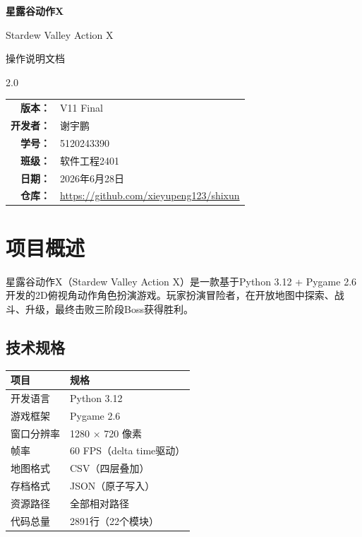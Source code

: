 \documentclass[12pt,a4paper]{ctexart}
\begin{document}
\begin{titlepage}
\thispagestyle{empty}
\centering
\vspace*{2cm}
{\Huge\bfseries\sffamily 星露谷动作X}

\vspace{0.5cm}
{\LARGE Stardew Valley Action X}

\vspace{1cm}
{\Large 操作说明文档}

\vspace{3cm}
\begin{spacing}{2.0}
\begin{tabular}{rl}
\textbf{版本：} & V11 Final \\
\textbf{开发者：} & 谢宇鹏 \\
\textbf{学号：} & 5120243390 \\
\textbf{班级：} & 软件工程2401 \\
\textbf{日期：} & 2026年6月28日 \\
\textbf{仓库：} & \url{https://github.com/xieyupeng123/shixun} \\
\end{tabular}
\end{spacing}
\vfill
\end{titlepage}

\tableofcontents
\newpage

\section{项目概述}

星露谷动作X（Stardew Valley Action X）是一款基于Python 3.12 + Pygame 2.6开发的2D俯视角动作角色扮演游戏。玩家扮演冒险者，在开放地图中探索、战斗、升级，最终击败三阶段Boss获得胜利。

\subsection{技术规格}

\begin{table}[H]
\centering
\begin{tabular}{ll}
\toprule
\textbf{项目} & \textbf{规格} \\
\midrule
开发语言 & Python 3.12 \\
游戏框架 & Pygame 2.6 \\
窗口分辨率 & 1280 × 720 像素 \\
帧率 & 60 FPS（delta time驱动） \\
地图格式 & CSV（四层叠加） \\
存档格式 & JSON（原子写入） \\
资源路径 & 全部相对路径 \\
代码总量 & 2891行（22个模块） \\
\bottomrule
\end{tabular}
\end{table}
\end{document}
